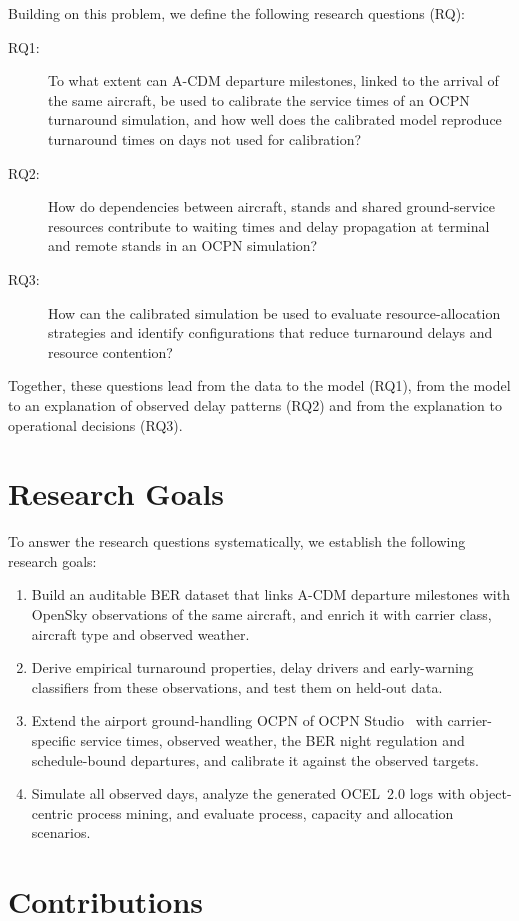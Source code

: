 Building on this problem, we define the following research questions (RQ):
\begin{description}
\item[RQ1:] To what extent can A-CDM departure milestones, linked to the arrival of the same aircraft, be used to calibrate the service times of an OCPN turnaround simulation, and how well does the calibrated model reproduce turnaround times on days not used for calibration?
\item[RQ2:] How do dependencies between aircraft, stands and shared ground-service resources contribute to waiting times and delay propagation at terminal and remote stands in an OCPN simulation?
\item[RQ3:] How can the calibrated simulation be used to evaluate resource-allocation strategies and identify configurations that reduce turnaround delays and resource contention?
\end{description}
Together, these questions lead from the data to the model (RQ1), from the model to an explanation of observed delay patterns (RQ2) and from the explanation to operational decisions (RQ3).

\section{Research Goals}
\label{sec:goals}

To answer the research questions systematically, we establish the following research goals:
\begin{enumerate}
\item Build an auditable BER dataset that links A-CDM departure milestones with OpenSky observations of the same aircraft, and enrich it with carrier class, aircraft type and observed weather.
\item Derive empirical turnaround properties, delay drivers and early-warning classifiers from these observations, and test them on held-out data.
\item Extend the airport ground-handling OCPN of OCPN Studio~\cite{ocpn_studio} with carrier-specific service times, observed weather, the BER night regulation and schedule-bound departures, and calibrate it against the observed targets.
\item Simulate all observed days, analyze the generated OCEL~2.0 logs with object-centric process mining, and evaluate process, capacity and allocation scenarios.
\end{enumerate}

\section{Contributions}
\label{sec:contrib}

